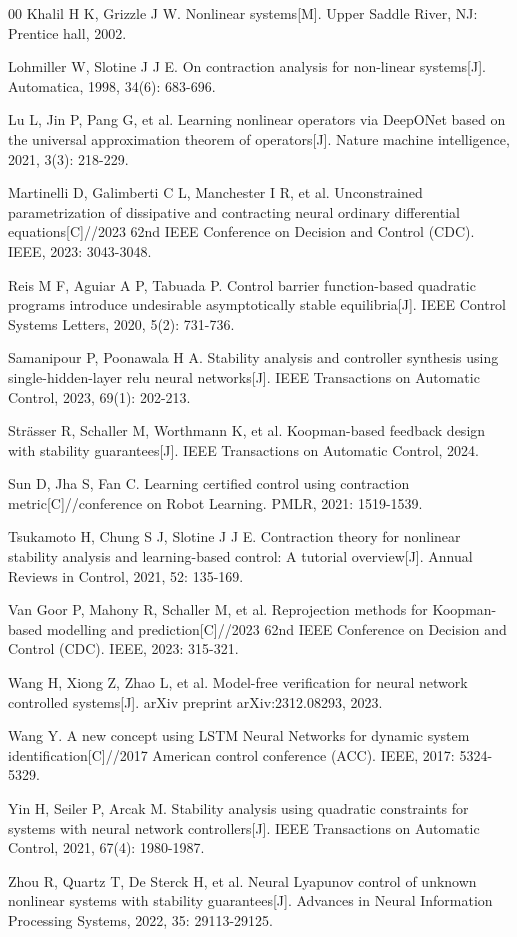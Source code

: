 \documentclass[journal,twoside,web]{ieeecolor}
\begin{document}
\begin{thebibliography}{00}
 Khalil H K, Grizzle J W. Nonlinear systems[M]. Upper Saddle River, NJ: Prentice hall, 2002.

 Lohmiller W, Slotine J J E. On contraction analysis for non-linear systems[J]. Automatica, 1998, 34(6): 683-696.

 Lu L, Jin P, Pang G, et al. Learning nonlinear operators via DeepONet based on the universal approximation theorem of operators[J]. Nature machine intelligence, 2021, 3(3): 218-229.

 Martinelli D, Galimberti C L, Manchester I R, et al. Unconstrained parametrization of dissipative and contracting neural ordinary differential equations[C]//2023 62nd IEEE Conference on Decision and Control (CDC). IEEE, 2023: 3043-3048.

 Reis M F, Aguiar A P, Tabuada P. Control barrier function-based quadratic programs introduce undesirable asymptotically stable equilibria[J]. IEEE Control Systems Letters, 2020, 5(2): 731-736.

 Samanipour P, Poonawala H A. Stability analysis and controller synthesis using single-hidden-layer relu neural networks[J]. IEEE Transactions on Automatic Control, 2023, 69(1): 202-213.

 Strässer R, Schaller M, Worthmann K, et al. Koopman-based feedback design with stability guarantees[J]. IEEE Transactions on Automatic Control, 2024.

 Sun D, Jha S, Fan C. Learning certified control using contraction metric[C]//conference on Robot Learning. PMLR, 2021: 1519-1539.

 Tsukamoto H, Chung S J, Slotine J J E. Contraction theory for nonlinear stability analysis and learning-based control: A tutorial overview[J]. Annual Reviews in Control, 2021, 52: 135-169.

 Van Goor P, Mahony R, Schaller M, et al. Reprojection methods for Koopman-based modelling and prediction[C]//2023 62nd IEEE Conference on Decision and Control (CDC). IEEE, 2023: 315-321.

 Wang H, Xiong Z, Zhao L, et al. Model-free verification for neural network controlled systems[J]. arXiv preprint arXiv:2312.08293, 2023.

 Wang Y. A new concept using LSTM Neural Networks for dynamic system identification[C]//2017 American control conference (ACC). IEEE, 2017: 5324-5329.

 Yin H, Seiler P, Arcak M. Stability analysis using quadratic constraints for systems with neural network controllers[J]. IEEE Transactions on Automatic Control, 2021, 67(4): 1980-1987.

 Zhou R, Quartz T, De Sterck H, et al. Neural Lyapunov control of unknown nonlinear systems with stability guarantees[J]. Advances in Neural Information Processing Systems, 2022, 35: 29113-29125.
\end{thebibliography}
\end{document}

